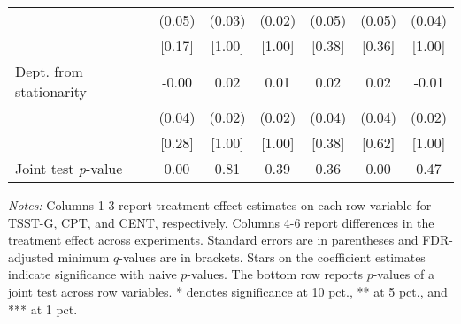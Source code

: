 \begin{table}[htbp]
{\begin{threeparttable}
\begin{tabular}{l*{6}{c}}
          &   (0.05)&   (0.03)&   (0.02)&   (0.05)&   (0.05)&   (0.04)\\
          &   [0.17]&   [1.00]&   [1.00]&   [0.38]&   [0.36]&   [1.00]\\
Dept. from stationarity&    -0.00&     0.02&     0.01&     0.02&     0.02&    -0.01\\
          &   (0.04)&   (0.02)&   (0.02)&   (0.04)&   (0.04)&   (0.02)\\
          &   [0.28]&   [1.00]&   [1.00]&   [0.38]&   [0.62]&   [1.00]\\
\midrule Joint test \emph{p}-value&0.00\sym{***}&     0.81&     0.39&     0.36&0.00\sym{***}&     0.47\\
\bottomrule \end{tabular} \begin{tablenotes}[flushleft] \footnotesize \item \emph{Notes:} Columns 1-3 report treatment effect estimates on each row variable for TSST-G, CPT, and CENT, respectively. Columns 4-6 report differences in the treatment effect across experiments. Standard errors are in parentheses and FDR-adjusted minimum \(q\)-values are in brackets. Stars on the coefficient estimates indicate significance with naive \(p\)-values. The bottom row reports \(p\)-values of a joint test across row variables. * denotes significance at 10 pct., ** at 5 pct., and *** at 1 pct. \end{tablenotes} \end{threeparttable} } \end{table}
